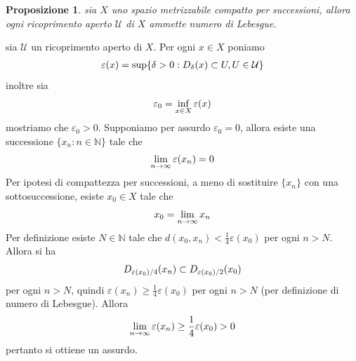 \documentclass[oneside, 11pt]{amsbook}
\makeatletter
\newcommand{\0}{{(0)}}
\newcommand{\3}{{(3)}}
\theoremstyle{colonplain}
\newtheorem{prop}[thm]{Proposizione}
\theoremstyle{colondefinition}
\theoremstyle{colonremark}
\numberwithin{equation}{chapter}
\renewcommand{\proofname}{Dimostrazione}
\renewenvironment{proof}[1][\proofname]{\par
  \pushQED{\qed}%
  \normalfont \topsep6\p@\@plus6\p@\relax
  \trivlist
  \item[\hskip\labelsep\bfseries #1:]\ignorespaces
}{%
  \popQED\endtrivlist\@endpefalse
}
\makeatother
\begin{document}
\begin{prop}\label{LebesgueNumber}
sia $X$ uno spazio metrizzabile compatto per successioni, allora ogni ricoprimento aperto $\mathcal{U}$ di $X$ ammette numero di Lebesgue.
\end{prop}
\begin{proof}
sia $\mathcal{U}$ un ricoprimento aperto di $X$. Per ogni $x \in X$ poniamo 
\begin{align}
    \varepsilon(x) = \sup\{\delta > 0 : D_\delta(x) \subset U, U \in \mathcal{U}\} \notag
\end{align}
inoltre sia 
\begin{align}
    \varepsilon_0 = \inf_{x \in X}\varepsilon(x) \notag
\end{align}
mostriamo che $\varepsilon_0 > 0$. Supponiamo per assurdo $\varepsilon_0 = 0$, allora esiste una successione $\{x_n : n  \in \mathbb{N}\}$ tale che 
\begin{align}
    \lim_{n \rightarrow \infty}\varepsilon(x_n) = 0 \notag
\end{align}
Per ipotesi di compattezza per successioni, a meno di sostituire $\{x_n\}$ con una sottosuccessione, esiste $x_0 \in X$ tale che 
\begin{align}
    x_0 = \lim_{n \rightarrow \infty}x_n \notag
\end{align}
Per definizione esiste $N \in \mathbb{N}$ tale che $d(x_0, x_n) < \frac{1}{4}\varepsilon(x_0)$ per ogni $n > N$. Allora si ha 
\begin{align}
    D_{\varepsilon(x_0)/4}(x_n) \subset D_{\varepsilon(x_0)/2}(x_0) \notag
\end{align}
per ogni $n > N$, quindi $\varepsilon(x_n) \geq \frac{1}{4}\varepsilon(x_0)$ per ogni $n > N$ (per definizione di numero di Lebesgue). Allora 
\begin{align}
    \lim_{n \rightarrow \infty}\varepsilon(x_n) \geq \frac{1}{4}\varepsilon(x_0) > 0 \notag
\end{align}
pertanto si ottiene un assurdo.
\end{proof}
\end{document}
